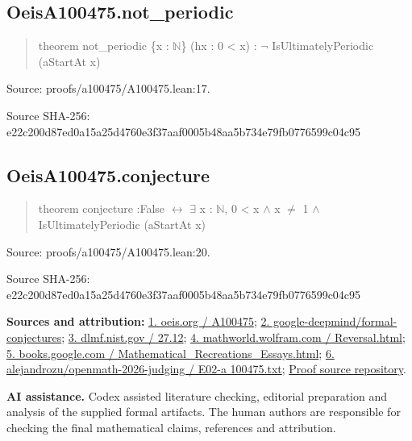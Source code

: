 \documentclass[11pt,a4paper]{article}
\begin{document}
\begin{samepage}
\subsection{OeisA100475.not\_periodic}
\begin{quote}\small\ttfamily theorem not\_periodic \{x : \ensuremath{\mathbb{N}}\} (hx : 0 < x) : \ensuremath{\neg} IsUltimatelyPeriodic (aStartAt x)\end{quote}
{\small Source: proofs/a100475/A100475.lean:17.\par}

{\small Source SHA-256: e22c200d87ed0a15a25d4760e3f37aaf0005b48aa5b734e79fb0776599c04c95\par}

\end{samepage}
\begin{samepage}
\subsection{OeisA100475.conjecture}
\begin{quote}\small\ttfamily theorem conjecture :\newline     False \ensuremath{\leftrightarrow} \ensuremath{\exists} x : \ensuremath{\mathbb{N}}, 0 < x \ensuremath{\wedge} x \ensuremath{\neq} 1 \ensuremath{\wedge} IsUltimatelyPeriodic (aStartAt x)\end{quote}
{\small Source: proofs/a100475/A100475.lean:20.\par}

{\small Source SHA-256: e22c200d87ed0a15a25d4760e3f37aaf0005b48aa5b734e79fb0776599c04c95\par}

{\small\textbf{Sources and attribution:} \href{https://oeis.org/A100475}{1. oeis.org / A100475}; \href{https://github.com/google-deepmind/formal-conjectures/pull/5567}{2. google-deepmind/formal-conjectures}; \href{https://dlmf.nist.gov/27.12\#E2}{3. dlmf.nist.gov / 27.12}; \href{https://mathworld.wolfram.com/Reversal.html}{4. mathworld.wolfram.com / Reversal.html}; \href{https://books.google.com/books/about/Mathematical_Recreations_Essays.html?id=9lJqNJhYc9oC}{5. books.google.com / Mathematical\_Recreations\_Essays.html}; \href{https://github.com/alejandrozu/openmath-2026-judging/blob/d0ed487f487fa7ec814ff705ab55249983fe8707/OpenMath-Judging/review/entries/E02-a100475.txt}{6. alejandrozu/openmath-2026-judging / E02-a 100475.txt}; \href{https://github.com/alejandrozu/openmath-2026-judging}{Proof source repository}.\par}

\end{samepage}
{\small \textbf{AI assistance.} Codex assisted literature checking, editorial preparation and analysis of the supplied formal artifacts. The human authors are responsible for checking the final mathematical claims, references and attribution.\par}
\end{document}
